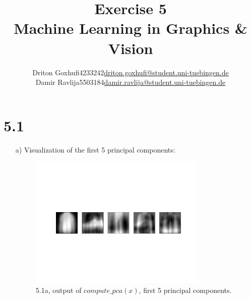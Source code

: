 \documentclass [a4paper, 11pt] {article}
\makeatletter
\newcommand{\courseName}{Machine Learning in Graphics \& Vision}
\newcommand{\homeworkNum}{5}
\newcommand{\studentOne}{Driton Goxhufi}
\newcommand{\studentTwo} {Damir Ravlija}
\newcommand{\matrikelNrStOne}{4233242}
\newcommand{\matrikelNrStTwo}{5503184}
\newcommand{\mailStOne}{driton.goxhufi@student.uni-tuebingen.de}
\newcommand{\mailStTwo}{damir.ravlija@student.uni-tuebingen.de}
\makeatother
\begin{document}
	
\title{\vspace{-1.5cm}\textbf{Exercise \homeworkNum} \\ 
	\courseName}
\author{\begin{tabular}{lcr}
		\studentOne & \matrikelNrStOne & \href{mailto:\mailStOne}{\mailStOne} \\
		\studentTwo & \matrikelNrStTwo & \href{mailto:\mailStTwo}{\mailStTwo} 
\end{tabular}}	
\date{}
\maketitle


\section*{5.1}
\begin{enumerate}
\item[a)]
Visualization of the first 5 principal components:\\
\begin{figure}[!h]
	\centering
	\includegraphics[width=0.8\textwidth]{template/out/pca/pc.png}
	\caption{ 5.1a, output of $compute\_pca(x)$, first 5 principal components.}
\end{figure}


\end{enumerate}
\end{document}

